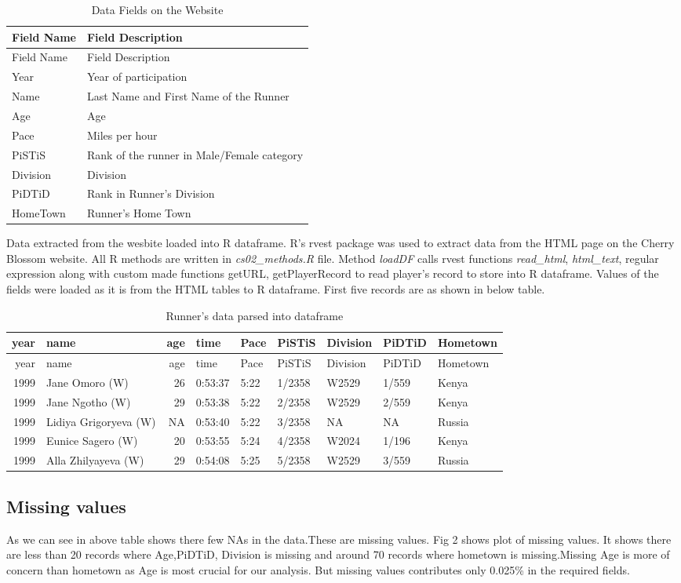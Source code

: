 \documentclass[
]{article}
\begin{document}
\begin{longtable}[]{@{}ll@{}}
\caption{Data Fields on the Website}\tabularnewline
\toprule
Field Name & Field Description\tabularnewline
\midrule
\endfirsthead
\toprule
Field Name & Field Description\tabularnewline
\midrule
\endhead
Year & Year of participation\tabularnewline
Name & Last Name and First Name of the Runner\tabularnewline
Age & Age\tabularnewline
Pace & Miles per hour\tabularnewline
PiSTiS & Rank of the runner in Male/Female category\tabularnewline
Division & Division\tabularnewline
PiDTiD & Rank in Runner's Division\tabularnewline
HomeTown & Runner's Home Town\tabularnewline
\bottomrule
\end{longtable}

Data extracted from the wesbite loaded into R dataframe. R's rvest
package was used to extract data from the HTML page on the Cherry
Blossom website. All R methods are written in \emph{cs02\_methods.R}
file. Method \emph{loadDF} calls rvest functions \emph{read\_html},
\emph{html\_text}, regular expression along with custom made functions
getURL, getPlayerRecord to read player's record to store into R
dataframe. Values of the fields were loaded as it is from the HTML
tables to R dataframe. First five records are as shown in below table.

\begin{longtable}[]{@{}rlrllllll@{}}
\caption{Runner's data parsed into dataframe}\tabularnewline
\toprule
year & name & age & time & Pace & PiSTiS & Division & PiDTiD &
Hometown\tabularnewline
\midrule
\endfirsthead
\toprule
year & name & age & time & Pace & PiSTiS & Division & PiDTiD &
Hometown\tabularnewline
\midrule
\endhead
1999 & Jane Omoro (W) & 26 & 0:53:37 & 5:22 & 1/2358 & W2529 & 1/559 &
Kenya\tabularnewline
1999 & Jane Ngotho (W) & 29 & 0:53:38 & 5:22 & 2/2358 & W2529 & 2/559 &
Kenya\tabularnewline
1999 & Lidiya Grigoryeva (W) & NA & 0:53:40 & 5:22 & 3/2358 & NA & NA &
Russia\tabularnewline
1999 & Eunice Sagero (W) & 20 & 0:53:55 & 5:24 & 4/2358 & W2024 & 1/196
& Kenya\tabularnewline
1999 & Alla Zhilyayeva (W) & 29 & 0:54:08 & 5:25 & 5/2358 & W2529 &
3/559 & Russia\tabularnewline
\bottomrule
\end{longtable}

\hypertarget{missing-values}{%
\subsection{Missing values}\label{missing-values}}

As we can see in above table shows there few NAs in the data.These are
missing values. Fig 2 shows plot of missing values. It shows there are
less than 20 records where Age,PiDTiD, Division is missing and around 70
records where hometown is missing.Missing Age is more of concern than
hometown as Age is most crucial for our analysis. But missing values
contributes only 0.025\% in the required fields.
\end{document}
